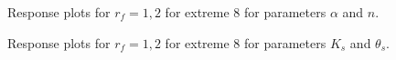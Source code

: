 \documentclass[review,times,3p,twocolumn,10pt]{elsarticle}
\begin{document}
\begin{figure}[htb!]
\label{ext6rf1-an2}
\caption{Response plots for $r_f=1,2$ for extreme 8 for parameters $\alpha$ and $n$.}
\end{figure}


\begin{figure}[htb!]
\label{ext6rf1-Kt2}
\caption{Response plots for $r_f=1,2$ for extreme 8 for parameters $K_s$ and $\theta_s$.}
\end{figure}
\end{document}
